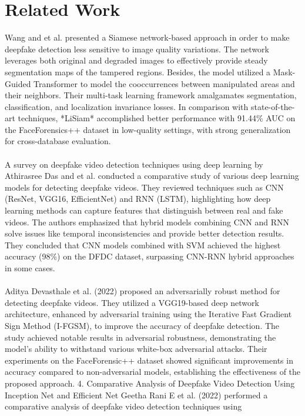 \section{Related Work}
Wang and et al. \cite{df16} presented a Siamese network-based approach in order to make deepfake detection less sensitive to image quality variations. The network leverages both original and degraded images to effectively provide steady segmentation maps of the tampered regions. Besides, the model utilized a Mask-Guided Transformer to model the cooccurrences between manipulated areas and their
neighbors. Their multi-task learning framework amalgamates segmentation, classification, and localization invariance losses. In comparison with state-of-the-art techniques, *LiSiam* accomplished better performance
with 91.44\% AUC on the FaceForensics++ dataset in low-quality settings, with strong generalization for cross-database evaluation.\\\\
A survey on deepfake video detection techniques using deep learning by Athirasree Das and et al. \cite{df15} conducted a comparative study of various deep learning models for detecting deepfake videos. They reviewed techniques such as CNN (ResNet, VGG16, EfficientNet) and RNN (LSTM), highlighting how deep learning methods can capture features that distinguish between real and
fake videos. The authors emphasized that hybrid models combining CNN and RNN solve issues like temporal inconsistencies and provide better detection results. They concluded that CNN models combined with SVM achieved the highest accuracy (98\%) on the DFDC dataset, surpassing CNN-RNN hybrid approaches in some cases.\\\\
Aditya Devasthale et al.\cite{df13} (2022) proposed an adversarially robust method for detecting deepfake videos. They utilized a VGG19-based deep network architecture, enhanced by adversarial training using the Iterative Fast Gradient Sign Method (I-FGSM), to improve the accuracy of deepfake detection. The study achieved notable results in adversarial robustness, demonstrating the model's ability to withstand various white-box adversarial attacks. Their experiments
on the FaceForensic++ dataset showed significant improvements in accuracy compared to non-adversarial models, establishing the effectiveness of the proposed approach.
4. Comparative Analysis of Deepfake Video Detection Using Inception Net and Efficient Net Geetha Rani E et al. (2022) performed a comparative analysis of deepfake video detection techniques using
